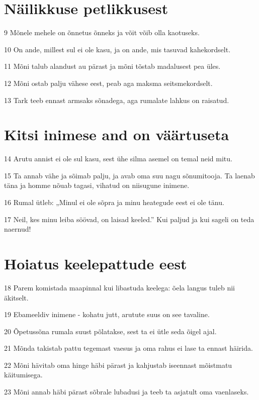 \section*{Näilikkuse petlikkusest}

\par 9 Mõnele mehele on õnnetus õnneks ja võit võib olla kaotuseks.
\par 10 On ande, millest sul ei ole kasu, ja on ande, mis tasuvad kahekordselt.
\par 11 Mõni talub alandust au pärast ja mõni tõstab madalusest pea üles.
\par 12 Mõni ostab palju vähese eest, peab aga maksma seitsmekordselt.
\par 13 Tark teeb ennast armsaks sõnadega, aga rumalate lahkus on raisatud.

\section*{Kitsi inimese and on väärtuseta}

\par 14 Arutu annist ei ole sul kasu, sest ühe silma asemel on temal neid mitu.
\par 15 Ta annab vähe ja sõimab palju, ja avab oma suu nagu sõnumitooja. Ta laenab täna ja homme nõuab tagasi, vihatud on niisugune inimene.
\par 16 Rumal ütleb: „Minul ei ole sõpra ja minu heategude eest ei ole tänu.
\par 17 Neil, kes minu leiba söövad, on laisad keeled.” Kui paljud ja kui sageli on teda naernud!

\section*{Hoiatus keelepattude eest}

\par 18 Parem komistada maapinnal kui libastuda keelega: õela langus tuleb nii äkitselt.
\par 19 Ebameeldiv inimene - kohatu jutt, arutute suus on see tavaline.
\par 20 Õpetussõna rumala suust põlatakse, sest ta ei ütle seda õigel ajal.
\par 21 Mõnda takistab pattu tegemast vaesus ja oma rahus ei lase ta ennast häirida.
\par 22 Mõni hävitab oma hinge häbi pärast ja kahjustab iseennast mõistmatu käitumisega.
\par 23 Mõni annab häbi pärast sõbrale lubadusi ja teeb ta asjatult oma vaenlaseks.

